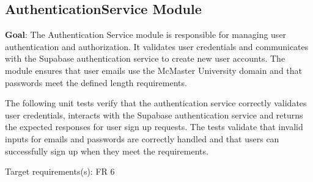 \documentclass[12pt, titlepage]{article}
\begin{document}
\subsection{AuthenticationService Module}
\textbf{Goal}:
The Authentication Service module is responsible for managing user authentication and authorization. 
It validates user credentials and communicates with the Supabase authentication service to create new user accounts. 
The module ensures that user emails use the McMaster University domain and that passwords meet the defined length requirements. 

The following unit tests verify that the authentication service correctly validates user credentials, interacts with the 
Supabase authentication service and returns the expected responses for user sign up requests. 
The tests validate that invalid inputs for emails and passwords are correctly handled and that users can successfully sign up when they meet the requirements. 

Target requirements(s): FR 6
\end{document}
